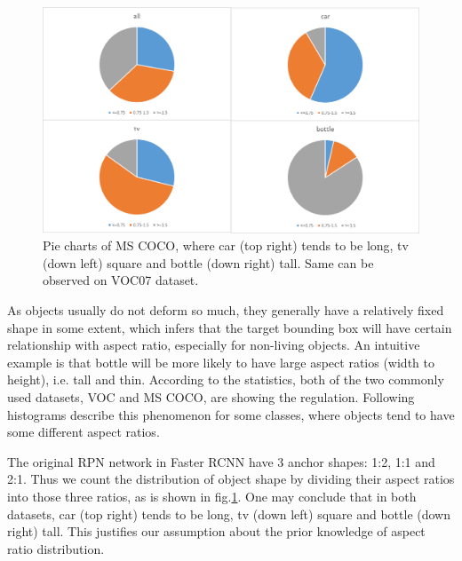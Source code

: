 \documentclass[10pt,twocolumn,letterpaper]{article}
\begin{document}
\begin{figure}[h]
\centering
\includegraphics[width=1\linewidth]{pic/dist_pics/pies_coco}
\caption{Pie charts of MS COCO\cite{coco}, where car (top right) tends to be long, tv (down left) square and bottle (down right) tall. Same can be observed on VOC07\cite{voc07} dataset.}
\label{fig:piescoco}
\end{figure}
As objects usually do not deform so much, they generally have a relatively fixed shape in some extent, which infers that the target bounding box will have certain relationship with aspect ratio, especially for non-living objects. An intuitive example is that bottle will be more likely to have large aspect ratios (width to height), i.e. tall and thin. According to the statistics, both of the two commonly used datasets, VOC and MS COCO, are showing the regulation. Following histograms describe this phenomenon for some classes, where objects tend to have some different aspect ratios. 





The original RPN network in Faster RCNN \cite{fasterRCNN} have 3 anchor shapes: 1:2, 1:1 and 2:1. Thus we count the distribution of object shape by dividing their aspect ratios into those three ratios, as is shown in fig.\ref{fig:piescoco}. One may conclude that in both datasets, car (top right) tends to be long, tv (down left) square and bottle (down right) tall. This justifies our assumption about the prior knowledge of aspect ratio distribution.
\end{document}
